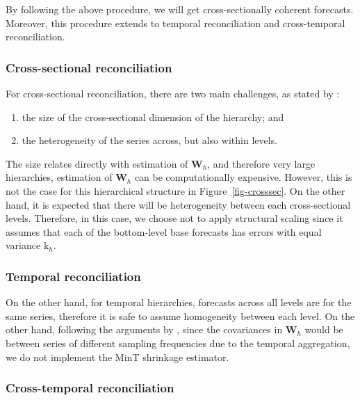\documentclass[
  11pt,
  a4paper,
]{article}
\providecommand{\tightlist}{%
  \setlength{\itemsep}{0pt}\setlength{\parskip}{0pt}}\usepackage{longtable,booktabs,array}
\begin{document}
By following the above procedure, we will get cross-sectionally coherent
forecasts. Moreover, this procedure extends to temporal reconciliation
and cross-temporal reconciliation.

\subsubsection{Cross-sectional
reconciliation}\label{cross-sectional-reconciliation}

For cross-sectional reconciliation, there are two main challenges, as
stated by \textcite{kourentzes2019cross}:

\begin{enumerate}
\def\labelenumi{\arabic{enumi}.}
\tightlist
\item
  the size of the cross-sectional dimension of the hierarchy; and
\item
  the heterogeneity of the series across, but also within levels.
\end{enumerate}

The size relates directly with estimation of \(\mathbf{W}_{h}\), and
therefore very large hierarchies, estimation of \(\mathbf{W}_{h}\) can
be computationally expensive. However, this is not the case for this
hierarchical structure in Figure~\ref{fig-crosssec}. On the other hand,
it is expected that there will be heterogeneity between each
cross-sectional levels. Therefore, in this case, we choose not to apply
structural scaling since it assumes that each of the bottom-level base
forecasts has errors with equal variance \(\text{k}_{h}\).

\subsubsection{Temporal reconciliation}\label{temporal-reconciliation}

On the other hand, for temporal hierarchies, forecasts across all levels
are for the same series, therefore it is safe to assume homogeneity
between each level. On the other hand, following the arguments by
\textcite{athanasopoulos2017forecasting}, since the covariances in
\(\mathbf{W}_{h}\) would be between series of different sampling
frequencies due to the temporal aggregation, we do not implement the
MinT shrinkage estimator.

\subsubsection{Cross-temporal
reconciliation}\label{cross-temporal-reconciliation}
\end{document}
